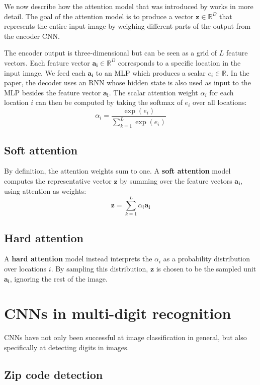 We now describe how the attention model that was introduced by \textcite{machine_translation_attention} works in more detail.
The goal of the attention model is to produce a vector $\mathbf{z} \in \mathbb{R}^D$ that represents the entire input image by weighing different parts of the output from the encoder CNN.

The encoder output is three-dimensional but can be seen as a grid of $L$ feature vectors. Each feature vector $\mathbf{a_i} \in \mathbb{R}^D$ corresponds to a specific location in the input image. We feed each $\mathbf{a_i}$ to an MLP which produces a scalar $e_i \in \mathbb{R}$. In the paper, the decoder uses an RNN whose hidden state is also used as input to the MLP besides the feature vector $\mathbf{a_i}$.
The scalar attention weight $\alpha_i$ for each location $i$ can then be computed by taking the softmax of $e_i$ over all locations:
\[
\alpha_i = \frac{ \exp(e_i) }{ \sum_{k=1}^L \exp(e_i) }
\]

\subsection{Soft attention} \label{sssec:soft_attention}
By definition, the attention weights sum to one. A \textbf{soft attention} model computes the representative vector $\mathbf{z}$ by summing over the feature vectors $\mathbf{a_i}$, using attention as weights:
\[
\mathbf{z} = \sum_{k=1}^L \alpha_i \mathbf{a_i}
\]

\subsection{Hard attention}
A \textbf{hard attention} model instead interprets the ${\alpha_i}$ as a probability distribution over locations $i$. By sampling this distribution, $\mathbf{z}$ is chosen to be the sampled unit $\mathbf{a_i}$, ignoring the rest of the image.

\newpage
\section{CNNs in multi-digit recognition}

CNNs have not only been successful at image classification in general, but also specifically at detecting digits in images.

\subsection{Zip code detection}

